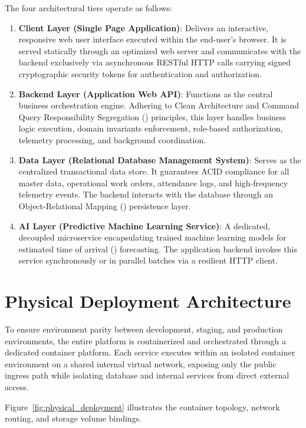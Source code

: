 The four architectural tiers operate as follows:
\begin{enumerate}
  \item \textbf{Client Layer (Single Page Application)}: Delivers an interactive, responsive web user interface executed within the end-user's browser. It is served statically through an optimized web server and communicates with the backend exclusively via asynchronous RESTful HTTP calls carrying signed cryptographic security tokens for authentication and authorization.
  \item \textbf{Backend Layer (Application Web API)}: Functions as the central business orchestration engine. Adhering to Clean Architecture and Command Query Responsibility Segregation () principles, this layer handles business logic execution, domain invariants enforcement, role-based authorization, telemetry processing, and background coordination.
  \item \textbf{Data Layer (Relational Database Management System)}: Serves as the centralized transactional data store. It guarantees ACID compliance for all master data, operational work orders, attendance logs, and high-frequency telemetry events. The backend interacts with the database through an Object-Relational Mapping () persistence layer.
  \item \textbf{AI Layer (Predictive Machine Learning Service)}: A dedicated, decoupled microservice encapsulating trained machine learning models for estimated time of arrival () forecasting. The application backend invokes this service synchronously or in parallel batches via a resilient HTTP client.
\end{enumerate}

\section{Physical Deployment Architecture}
\label{sec:deployment_architecture}

To ensure environment parity between development, staging, and production environments, the entire platform is containerized and orchestrated through a dedicated container platform. Each service executes within an isolated container environment on a shared internal virtual network, exposing only the public ingress path while isolating database and internal services from direct external access.

Figure~\ref{fig:physical_deployment} illustrates the container topology, network routing, and storage volume bindings.

